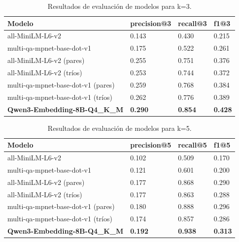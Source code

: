\begin{table}[!ht]
    \centering
    \begin{tabular}{|l|l|l|l|}
        \hline
        Modelo                               & precision@3    & recall@3       & f1@3           \\ \hline
        all-MiniLM-L6-v2                     & 0.143          & 0.430          & 0.215          \\ \hline
        multi-qa-mpnet-base-dot-v1           & 0.175          & 0.522          & 0.261          \\ \hline
        all-MiniLM-L6-v2 (pares)             & 0.255          & 0.751          & 0.376          \\ \hline
        all-MiniLM-L6-v2 (tríos)             & 0.253          & 0.744          & 0.372          \\ \hline
        multi-qa-mpnet-base-dot-v1 (pares)   & 0.259          & 0.768          & 0.384          \\ \hline
        multi-qa-mpnet-base-dot-v1 (tríos)   & 0.262          & 0.776          & 0.389          \\ \hline
        \textbf{Qwen3-Embedding-8B-Q4\_K\_M} & \textbf{0.290} & \textbf{0.854} & \textbf{0.428} \\ \hline
    \end{tabular}
    \caption{Resultados de evaluación de modelos para k=3.}
    \label{tab:results_train_3}
\end{table}

\begin{table}[!ht]
    \centering
    \begin{tabular}{|l|l|l|l|}
        \hline
        Modelo                               & precision@5    & recall@5       & f1@5           \\ \hline
        all-MiniLM-L6-v2                     & 0.102          & 0.509          & 0.170          \\ \hline
        multi-qa-mpnet-base-dot-v1           & 0.121          & 0.601          & 0.200          \\ \hline
        all-MiniLM-L6-v2 (pares)             & 0.177          & 0.868          & 0.290          \\ \hline
        all-MiniLM-L6-v2 (tríos)             & 0.177          & 0.863          & 0.288          \\ \hline
        multi-qa-mpnet-base-dot-v1 (pares)   & 0.180          & 0.888          & 0.296          \\ \hline
        multi-qa-mpnet-base-dot-v1 (tríos)   & 0.174          & 0.857          & 0.286          \\ \hline
        \textbf{Qwen3-Embedding-8B-Q4\_K\_M} & \textbf{0.192} & \textbf{0.938} & \textbf{0.313} \\ \hline
    \end{tabular}
    \caption{Resultados de evaluación de modelos para k=5.}
    \label{tab:results_train_5}
\end{table}

